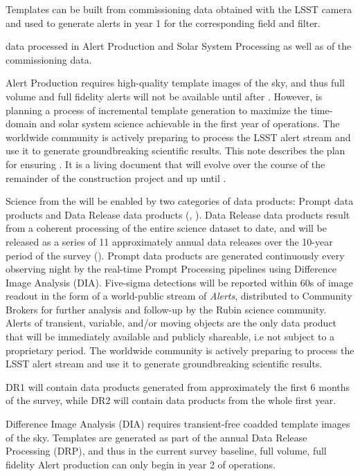 Templates can be built from commissioning data obtained with the LSST camera and used to generate alerts in year 1 for the corresponding field and filter. 

data processed in Alert Production and Solar System Processing as well as \dpvs of the commissioning data.


Alert Production requires high-quality template images of the sky, and thus full volume and full fidelity alerts will not be available until after \drone.
However, \ro is planning a process of incremental template generation to maximize the time-domain and solar system science achievable in the first year of operations.
The worldwide community is actively preparing to process the LSST alert stream and use it to generate groundbreaking scientific results. 
This note describes the \ro plan for ensuring \es. 
It is a living document that will evolve over the course of the remainder of the construction project and up until \drone. 

Science from the \rolsst will be enabled by two categories of data products: Prompt data products and Data Release data products (\citep{LPM-231}, \citep{LSE-163}). 
Data Release data products result from a coherent processing of the entire science dataset to date, and will be released as a series of 11 approximately annual data releases over the 10-year period of the survey (\citep{RDO-011}).
Prompt data products are generated continuously every observing night by the real-time Prompt Processing pipelines using Difference Image Analysis (DIA). 
Five-sigma detections will be reported within 60s of image readout in the form of a world-public stream of {\it Alerts}, distributed to Community Brokers for further analysis and follow-up by the Rubin science community.  
Alerts of transient, variable, and/or moving objects are the only data product that will be immediately available and publicly shareable, i.e not subject to a proprietary period.
The worldwide community is actively preparing to process the LSST alert stream and use it to generate groundbreaking scientific results. 
 
 
 
  DR1 will contain data products generated from approximately the first 6
months of the survey, while DR2 will contain data products from the whole first year.

Difference Image Analysis (DIA) requires transient-free coadded template images of the sky.
Templates are generated as part of the annual Data Release Processing (DRP), and thus in the current survey baseline, full volume, full fidelity Alert production can only begin in year 2 of operations. 

